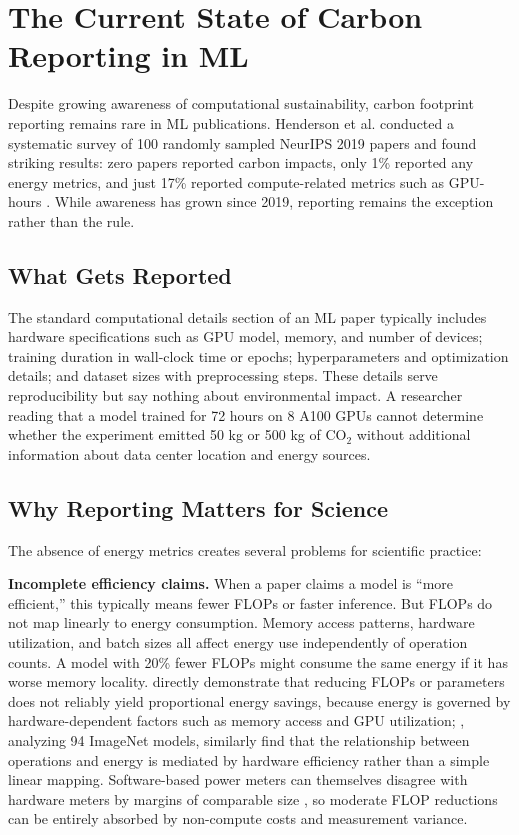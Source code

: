\documentclass{article}
\theoremstyle{plain}
\theoremstyle{definition}
\theoremstyle{remark}
\begin{document}
\section{The Current State of Carbon Reporting in ML}

Despite growing awareness of computational sustainability, carbon footprint reporting remains rare in ML publications. Henderson et al. conducted a systematic survey of 100 randomly sampled NeurIPS 2019 papers and found striking results: zero papers reported carbon impacts, only 1\% reported any energy metrics, and just 17\% reported compute-related metrics such as GPU-hours \cite{henderson2020towards}. While awareness has grown since 2019, reporting remains the exception rather than the rule.

\subsection{What Gets Reported}

The standard computational details section of an ML paper typically includes hardware specifications such as GPU model, memory, and number of devices; training duration in wall-clock time or epochs; hyperparameters and optimization details; and dataset sizes with preprocessing steps. These details serve reproducibility but say nothing about environmental impact. A researcher reading that a model trained for 72 hours on 8 A100 GPUs cannot determine whether the experiment emitted 50 kg or 500 kg of CO$_2$ without additional information about data center location and energy sources.

\subsection{Why Reporting Matters for Science}

The absence of energy metrics creates several problems for scientific practice:

\textbf{Incomplete efficiency claims.} When a paper claims a model is ``more efficient,'' this typically means fewer FLOPs or faster inference. But FLOPs do not map linearly to energy consumption. Memory access patterns, hardware utilization, and batch sizes all affect energy use independently of operation counts. A model with 20\% fewer FLOPs might consume the same energy if it has worse memory locality. \citet{gowda2023watt} directly demonstrate that reducing FLOPs or parameters does not reliably yield proportional energy savings, because energy is governed by hardware-dependent factors such as memory access and GPU utilization; \citet{desislavov2023trends}, analyzing 94 ImageNet models, similarly find that the relationship between operations and energy is mediated by hardware efficiency rather than a simple linear mapping. Software-based power meters can themselves disagree with hardware meters by margins of comparable size \cite{jay2023experimental}, so moderate FLOP reductions can be entirely absorbed by non-compute costs and measurement variance.
\end{document}
